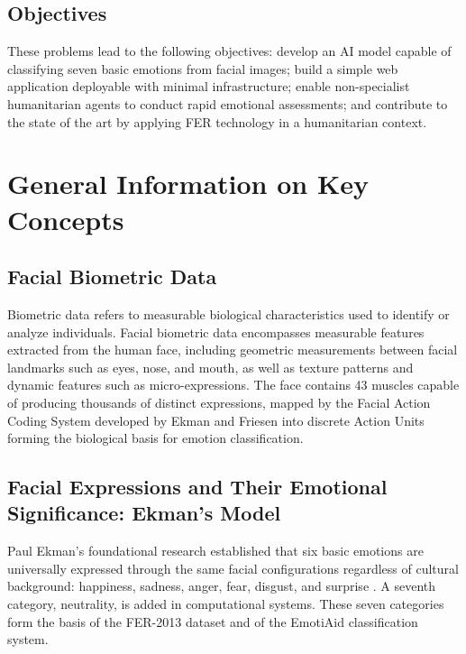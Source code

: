 \documentclass[a4paper,12pt,oneside]{report}
\begin{document}
\subsection{Objectives}

These problems lead to the following objectives: develop an AI model capable of
classifying seven basic emotions from facial images; build a simple web application
deployable with minimal infrastructure; enable non-specialist humanitarian agents
to conduct rapid emotional assessments; and contribute to the state of the art by
applying FER technology in a humanitarian context.

\section{General Information on Key Concepts}

\subsection{Facial Biometric Data}

Biometric data refers to measurable biological characteristics used to identify
or analyze individuals. Facial biometric data encompasses measurable features
extracted from the human face, including geometric measurements between facial
landmarks such as eyes, nose, and mouth, as well as texture patterns and dynamic
features such as micro-expressions. The face contains 43 muscles capable of
producing thousands of distinct expressions, mapped by the Facial Action Coding
System developed by Ekman and Friesen \cite{ekman1978} into discrete Action Units
forming the biological basis for emotion classification.

\subsection{Facial Expressions and Their Emotional Significance: Ekman's Model}

Paul Ekman's foundational research established that six basic emotions are
universally expressed through the same facial configurations regardless of
cultural background: happiness, sadness, anger, fear, disgust, and surprise
\cite{ekman1999}. A seventh category, neutrality, is added in computational
systems. These seven categories form the basis of the FER-2013 dataset and of
the EmotiAid classification system.
\end{document}
